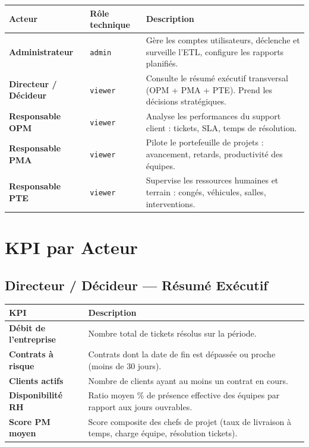 \documentclass[a4paper,12pt]{article}
\begin{document}
\vspace{0.5em}
\begin{center}
\begin{tabular}{>{\bfseries}p{3.5cm} p{3cm} p{8cm}}
\toprule
Acteur & Rôle technique & Description \\
\midrule
Administrateur       & \texttt{admin}  & Gère les comptes utilisateurs, déclenche et surveille
                                          l'ETL, configure les rapports planifiés. \\
\addlinespace
Directeur / Décideur & \texttt{viewer} & Consulte le résumé exécutif transversal (OPM + PMA + PTE).
                                          Prend les décisions stratégiques. \\
\addlinespace
Responsable OPM      & \texttt{viewer} & Analyse les performances du support client :
                                          tickets, SLA, temps de résolution. \\
\addlinespace
Responsable PMA      & \texttt{viewer} & Pilote le portefeuille de projets : avancement,
                                          retards, productivité des équipes. \\
\addlinespace
Responsable PTE      & \texttt{viewer} & Supervise les ressources humaines et terrain :
                                          congés, véhicules, salles, interventions. \\
\bottomrule
\end{tabular}
\end{center}

\section{KPI par Acteur}

\subsection{Directeur / Décideur — Résumé Exécutif}

\begin{longtable}{>{\bfseries}p{5cm} p{9.5cm}}
\toprule
KPI & Description \\
\midrule
\endhead
Débit de l'entreprise        & Nombre total de tickets résolus sur la période. \\
Contrats à risque             & Contrats dont la date de fin est dépassée ou proche
                                 (moins de 30 jours). \\
Clients actifs                & Nombre de clients ayant au moins un contrat en cours. \\
Disponibilité RH              & Ratio moyen \% de présence effective des équipes
                                 par rapport aux jours ouvrables. \\
Score PM moyen                & Score composite des chefs de projet (taux de livraison
                                 à temps, charge équipe, résolution tickets). \\
\bottomrule
\end{longtable}
\end{document}
